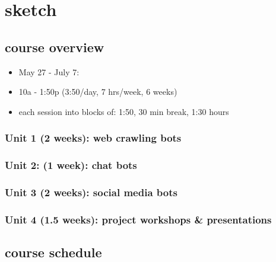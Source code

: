 \documentclass[11pt]{article}
\author{fcalado}
\date{\today}
\title{}
\begin{document}
\tableofcontents

\section{sketch}
\label{sec:orge9b8d62}


\subsection{course overview}
\label{sec:org16c67c1}
\begin{itemize}
\item May 27 - July 7:
\item 10a - 1:50p (3:50/day, 7 hrs/week, 6 weeks)
\item each session into blocks of: 1:50, 30 min break, 1:30 hours
\end{itemize}

\subsubsection{Unit 1 (2 weeks): web crawling bots}
\label{sec:org377f27b}
\subsubsection{Unit 2: (1 week): chat bots}
\label{sec:orgbe93eba}
\subsubsection{Unit 3 (2 weeks): social media bots}
\label{sec:orga2e8e0e}
\subsubsection{Unit 4 (1.5 weeks): project workshops \& presentations}
\label{sec:org65179bc}

\subsection{course schedule}
\label{sec:orgf9cb288}
\end{document}

